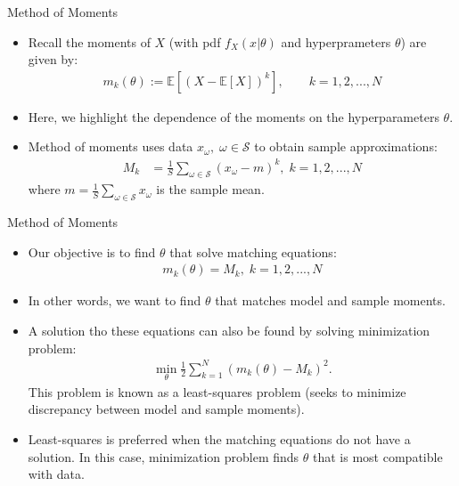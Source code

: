 \documentclass[9pt]{beamer}
\begin{document}
\begin{frame}{Method of Moments}

\begin{itemize}
\setlength{\itemsep}{5pt}
\item Recall the moments of $X$ (with pdf $f_X(x|\theta)$ and hyperprameters $\theta$) are given by:
\begin{align*}
m_k(\theta):=\mathbb{E}[(X-\mathbb{E}[X])^k], \qquad k=1,2,...,N
\end{align*}
\item Here, we highlight the dependence of the moments on the hyperparameters $\theta$. 

\item Method of moments uses data $x_\omega,\; \omega \in \mathcal{S}$ to obtain sample approximations: 
\begin{align*}
M_k&=\frac{1}{S}\sum_{\omega\in \mathcal{S}}(x_\omega-m)^k, \; k=1,2,...,N
\end{align*}
where $m=\frac{1}{S}\sum_{\omega\in \mathcal{S}}x_\omega$ is the sample mean.

\end{itemize}

\end{frame}


\begin{frame}{Method of Moments}

\begin{itemize}
\setlength{\itemsep}{5pt}
\item Our objective is to find $\theta$ that solve matching equations:
\begin{align*}
m_k(\theta)=M_k,\; k=1,2,...,N
\end{align*}
\item In other words, we want to find $\theta$ that matches model and sample moments. 

\item A solution tho these equations can also be found by solving minimization problem:
\begin{align*}
\min_\theta \frac{1}{2}\sum_{k=1}^N(m_k(\theta)-M_k)^2.
\end{align*}
This problem is known as a least-squares problem (seeks to minimize discrepancy between model and sample moments). 

\item Least-squares is preferred when the matching equations do not have a solution. In this case, minimization problem finds $\theta$ that is most compatible with data.  

\end{itemize}

\end{frame}
\end{document}
